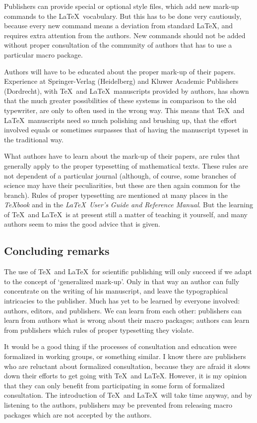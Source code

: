 Publishers can provide special or optional style files, which add new
mark-up commands to the \LaTeX\ vocabulary.
But this has to be done very cautiously, because every new command means a
deviation from standard \LaTeX, and requires extra attention from the
authors.
New commands should not be added without proper consultation of the
community of authors that has to use a particular macro package.

Authors will have to be educated about the proper mark-up of their papers.
Experience at Springer-Verlag (Heidelberg) and Kluwer Academic Publishers
(Dordrecht), with \TeX\ and \LaTeX\ manuscripts provided by authors, has
shown that the much greater possibilities of these systems in comparison to
the old typewriter, are only to often used in the wrong way.
This means that \TeX\ and \LaTeX\ manuscripts need so much polishing and
brushing up, that the effort involved equals or sometimes surpasses that
of having the manuscript typeset in the traditional way.

What authors have to learn about the mark-up of their papers, are rules
that generally apply to the proper typesetting of mathematical texts.
These rules are not dependent of a particular journal (although, of course,
some branches of science may have their peculiarities, but these are then
again common for the branch).
Rules of proper typesetting are mentioned at many places in the
{\sl TeX{}book\/} and in the {\sl \LaTeX\ User's Guide and Reference Manual}.
But the learning of \TeX\ and \LaTeX\ is at present still a matter
of teaching it yourself, and many authors seem to miss the good advice
that is given.

\subsection{Concluding remarks}

The use of \TeX\ and \LaTeX\ for scientific publishing will only succeed
if we adapt to the concept of `generalized mark-up'.
Only in that way an author can fully concentrate on the writing of his
manuscript, and leave the typographical intricacies to the publisher.
Much has yet to be learned by everyone involved: authors, editors, and
publishers.
We can learn from each other: publishers can learn from authors what
is wrong about their macro packages; authors can learn from publishers
which rules of proper typesetting they violate.

It would be a good thing if the processes of consultation and education
were formalized in working groups, or something similar.
I know there are publishers who are reluctant about formalized consultation,
because they are afraid it slows down their efforts to get going with
\TeX\ and \LaTeX.
However, it is my opinion that they can only benefit from participating
in some form of formalized consultation.
The introduction of \TeX\ and \LaTeX\ will take time anyway, and by listening
to the authors, publishers may be prevented from releasing macro packages
which are not accepted by the authors.

